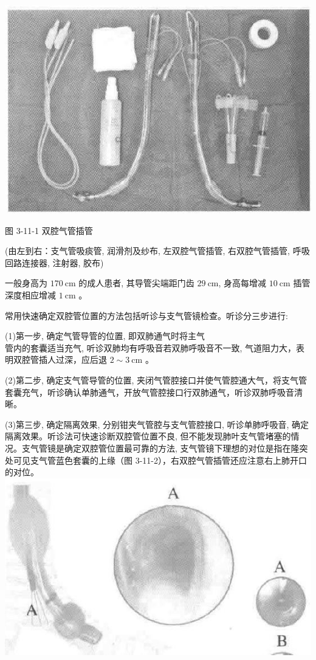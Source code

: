 \documentclass[10pt]{article}
\begin{document}
\begin{center}
\includegraphics[max width=\textwidth]{2024_07_05_645bb794a4d4f32ee0c8g-220}
\end{center}

图 3-11-1 双腔气管插管

(由左到右：支气管吸痰管, 润滑剂及纱布, 左双腔气管插管, 右双腔气管插管, 呼吸回路连接器, 注射器, 胶布)

一般身高为 $170 \mathrm{~cm}$ 的成人患者, 其导管尖端距门齿 $29 \mathrm{~cm}$, 身高每增减 $10 \mathrm{~cm}$ 插管深度相应增减 $1 \mathrm{~cm}$ 。

常用快速确定双腔管位置的方法包括听诊与支气管镜检查。听诊分三步进行:

(1)第一步, 确定气管导管的位置, 即双肺通气时将主气\\
管内的套囊适当充气, 听诊双肺均有呼吸音若双肺呼吸音不一致, 气道阻力大，表明双腔管插人过深，应后退 $2 \sim 3 \mathrm{~cm}$ 。

(2)第二步, 确定支气管导管的位置, 夹闭气管腔接口并使气管腔通大气，将支气管套囊充气，听诊确认单肺通气，开放气管腔接口行双肺通气，听诊双肺呼吸音清晰。

(3)第三步, 确定隔离效果, 分别钳夹气管腔与支气管腔接口, 听诊单肺呼吸音, 确定隔离效果。听诊法可快速诊断双腔管位置不良, 但不能发现肺叶支气管堵塞的情况。支气管镜是确定双腔管位置最可靠的方法, 支气管镜下理想的对位是指在隆突处可见支气管蓝色套囊的上缘（图 3-11-2），右双腔气管插管还应注意右上肺开口的对位。\\
\includegraphics[max width=\textwidth, center]{2024_07_05_645bb794a4d4f32ee0c8g-221}
\end{document}

